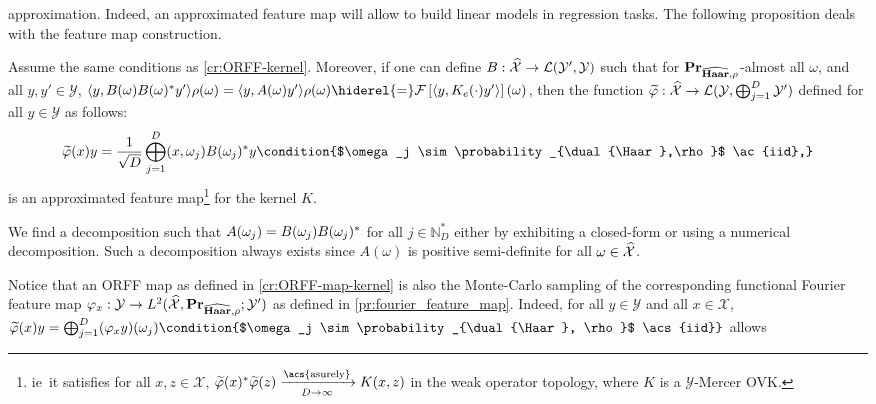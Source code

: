 \documentclass[twoside,11pt]{article}
\begin{document}
approximation. Indeed, an approximated feature map will allow to build linear
models in regression tasks. The following proposition deals with the feature
map construction.
\begin{proposition}
    \label{cr:ORFF-map-kernel} Assume the same conditions as
    \cref{cr:ORFF-kernel}. Moreover, if one can define $B: \widehat{\mathcal{X}}
    \to \mathcal{L}(\mathcal{Y}',\mathcal{Y})$ such that for
    ${\mathbf{{Pr}}}_{\widehat{\mathbf{Haar}},\rho}$-almost all $\omega$, and all $y,
    y'\in\mathcal{Y}$, $\inner{y, B(\omega)B(\omega)^\adjoint y'}\rho(\omega)=
    \inner{y, A(\omega)y'}\rho(\omega) \hiderel{=} \FT{\inner{y,
    K_e(\cdot)y'}}(\omega)$, then the function
    $\tildePhi{\omega}:\dual{\mathcal{X}} \to \mathcal{L}(\mathcal{Y},
    \Vect_{j=1}^D \mathcal{Y'})$ defined for all $y \in \mathcal{Y}$ as
    follows:
    \begin{dmath*}
        \tildePhi{\omega}(x)y
        = \frac{1}{\sqrt{D}}\Vect_{j=1}^D\pairing{x,
        \omega_j}B(\omega_j)^\adjoint y \condition{$\omega_j \sim
        \probability_{\dual{\Haar},\rho}$ \ac{iid},}
    \end{dmath*}
    is an approximated feature map\footnote{\acs{ie}~it satisfies
    for all $x,z\in\mathcal{X}$, $\tildePhi{\omega}(x)^\adjoint
    \tildePhi{\omega}(z)\converges{\acs{asurely}}{D\to\infty}K(x,z)$ in the
    weak operator topology, where $K$ is a $\mathcal{Y}$-Mercer \acs{OVK}.} for
    the kernel $K$.
\end{proposition}
\begin{remark}
    We find a decomposition such that
    $A(\omega_j)=B(\omega_j)B(\omega_j)^* $ for all $j\in\mathbb{N}^*_D$
    either by exhibiting a closed-form or using a numerical decomposition.
    Such a decomposition always exists since $A(\omega)$ is positive
    semi-definite for all $\omega\in\widehat{\mathcal{X}}$.
\end{remark}
Notice that an \acs{ORFF} map as defined in \cref{cr:ORFF-map-kernel} is also
the Monte-Carlo sampling of the corresponding functional Fourier feature map
$\Phi_x: \mathcal{Y} \to L^2(\dual{\mathcal{X}}, \probability_{\dual{\Haar},
\rho}; \mathcal{Y}' )$ as defined in \cref{pr:fourier_feature_map}.  Indeed,
for all $y\in\mathcal{Y}$ and all $x\in\mathcal{X}$, $\tildePhi{\omega}(x)y =
\Vect_{j=1}^D (\Phi_x y)(\omega_j) \condition{$\omega_j \sim
\probability_{\dual{\Haar}, \rho}$ \acs{iid}}$  allows
\end{document}
